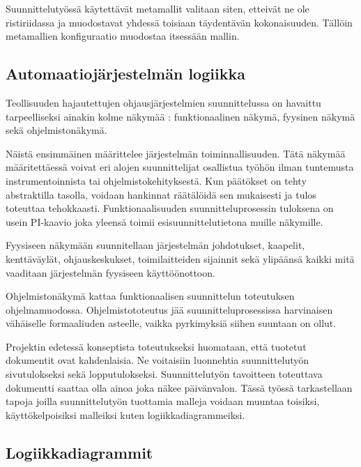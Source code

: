 \documentclass[finnish,12pt]{article}
\begin{document}
Suunnittelutyössä käytettävät metamallit valitaan siten, etteivät ne ole
ristiriidassa ja muodostavat yhdessä toisiaan täydentävän kokonaisuuden. Tällöin
metamallien konfiguraatio muodostaa itsessään mallin.

	\subsection{Automaatiojärjestelmän logiikka}

Teollisuuden hajautettujen ohjausjärjestelmien suunnittelussa on havaittu
tarpeelliseksi ainakin kolme näkymää \cite{RefWorks:38}: funktionaalinen näkymä,
fyysinen näkymä sekä ohjelmistonäkymä.

Näistä ensimmäinen määrittelee järjestelmän toiminnallisuuden. Tätä näkymää
määritettäessä voivat eri alojen suunnittelijat osallistua työhön ilman
tuntemusta instrumentoinnista tai ohjelmistokehityksestä. Kun päätökset on tehty
abstraktilla tasolla, voidaan hankinnat räätälöidä sen mukaisesti ja tulos
toteuttaa tehokkaasti. Funktionaalisuuden suunnitteluprosessin tuloksena on usein
PI-kaavio joka yleensä toimii esisuunnittelutietona muille näkymille.

Fyysiseen näkymään suunnitellaan järjestelmän johdotukset, kaapelit, kenttäväylät,
ohjauskeskukset, toimilaitteiden sijainnit sekä ylipäänsä kaikki mitä vaaditaan järjestelmän fyysiseen käyttöönottoon.

Ohjelmistonäkymä kattaa funktionaalisen suunnittelun toteutuksen ohjelmamuodossa.
Ohjelmistototeutus jää suunnitteluprosessissa harvinaisen vähäiselle formaaliuden asteelle, vaikka pyrkimyksiä siihen suuntaan on ollut.

Projektin edetessä konseptista toteutukseksi huomataan, että tuotetut dokumentit ovat kahdenlaisia.
Ne voitaisiin luonnehtia suunnittelutyön sivutulokseksi sekä lopputulokseksi.
Suunnittelutyön tavoitteen toteuttava dokumentti saattaa olla ainoa joka näkee päivänvalon.
Tässä työssä tarkastellaan tapoja joilla suunnittelutyön tuottamia malleja voidaan muuntaa
toisiksi, käyttökelpoisiksi malleiksi kuten logiikkadiagrammeiksi.

	\subsection{Logiikkadiagrammit}
\end{document}
